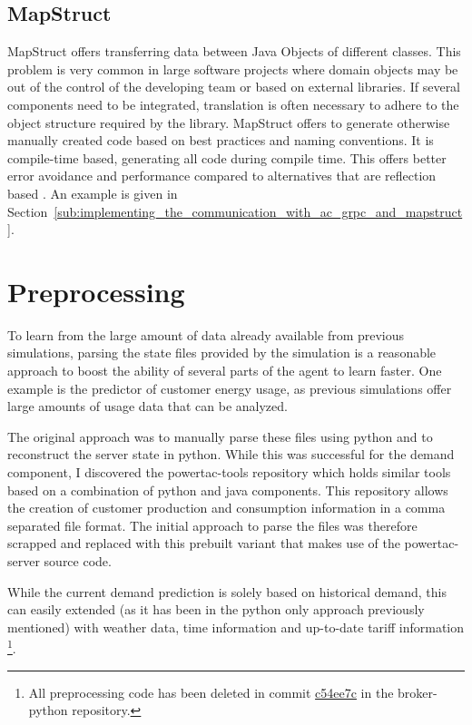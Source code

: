 \subsection{MapStruct}%
\label{sub:mapstruct}

MapStruct offers transferring data between Java Objects of different classes. This problem is very common in large
software projects where domain objects may be out of the control of the developing team or based on external libraries.
If several components need to be integrated, translation is often necessary to adhere to the object structure required
by the library. MapStruct offers to generate otherwise manually created code based on best practices and naming
conventions. It is compile-time based, generating all code during compile time. This offers better error avoidance and
performance compared to alternatives that are reflection based
\citep[]{mapstruct}.
An example is given in Section~\ref{sub:implementing_the_communication_with_ac_grpc_and_mapstruct}.

\section{Preprocessing}

To learn from the large amount of data already available from previous simulations, parsing the state files provided by
the simulation is a reasonable approach to boost the ability of several parts of the agent to learn faster. One example
is the predictor of customer energy usage, as previous simulations offer large amounts of usage data that can be
analyzed. 

The original approach was to manually parse these files using python and to reconstruct the server state in python.
While this was successful for the demand component, I discovered the powertac-tools repository which holds similar tools
based on a combination of python and java components. This repository allows the creation of customer production and
consumption information in a comma separated file format. The initial approach to parse the files was therefore scrapped
and replaced with this prebuilt variant that makes use of the powertac-server source code. 

While the current demand prediction is solely based on historical demand, this can easily extended (as it has been in
the python only approach previously mentioned) with weather data, time information and up-to-date tariff information
\footnote{All preprocessing code has been deleted in commit
\href{https://github.com/pascalwhoop/broker-python/commit/c54ee7c05585d15462f40e2be6850343e8aea27a}{c54ee7c} in the
broker-python repository.}.


